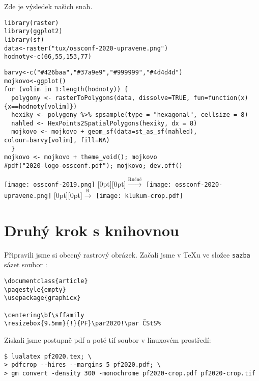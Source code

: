 Zde je výsledek našich snah.
\newpage
\begin{lstlisting}
library(raster)
library(ggplot2)
library(sf)
data<-raster("tux/ossconf-2020-upravene.png")
hodnoty<-c(66,55,153,77)
\end{lstlisting}


\begin{lstlisting}
barvy<-c("#426baa","#37a9e9","#999999","#4d4d4d")
mojkovo<-ggplot()
for (volim in 1:length(hodnoty)) {
  polygony <- rasterToPolygons(data, dissolve=TRUE, fun=function(x){x==hodnoty[volim]})
  hexiky <- polygony %>% spsample(type = "hexagonal", cellsize = 8)
  nahled <- HexPoints2SpatialPolygons(hexiky, dx = 8)
  mojkovo <- mojkovo + geom_sf(data=st_as_sf(nahled), colour=barvy[volim], fill=NA)
  }
mojkovo <- mojkovo + theme_void(); mojkovo
#pdf("2020-logo-ossconf.pdf"); mojkovo; dev.off()
\end{lstlisting}

\def\sipka#1{\raisebox{1cm}[0pt][0pt]{$\xrightarrow{\text{#1}}$}}
\noindent
\texttt{[image: ossconf-2019.png]}%
\sipka{Ručně}%
\texttt{[image: ossconf-2020-upravene.png]}%
\sipka{\ R\ } %
\texttt{[image: klukum-crop.pdf]}%


\section{Druhý krok s knihovnou }
Připravili jsme si obecný rastrový obrázek. Začali jsme v \TeX u ve složce \texttt{sazba} sázet soubor :
\begin{lstlisting}
\documentclass{article}
\pagestyle{empty}
\usepackage{graphicx}

\centering\bf\sffamily
\resizebox{9.5mm}{!}{PF}\par2020!\par ČStS%

\end{lstlisting}

Získali jsme postupně pdf a poté tif soubor v linuxovém prostředí:
\begin{lstlisting}
$ lualatex pf2020.tex; \
> pdfcrop --hires --margins 5 pf2020.pdf; \
> gm convert -density 300 -monochrome pf2020-crop.pdf pf2020-crop.tif
\end{lstlisting}

